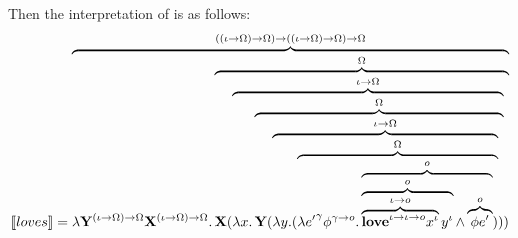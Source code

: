 Then the interpretation of  is as follows:
\begin{align}
\I{loves} = \overbrace{\lambda \Y2^{(\iota \rightarrow \Omega) \rightarrow \Omega} \X2^{(\iota \rightarrow \Omega) \rightarrow \Omega}.  \overbrace{\X2 ( \overbrace{\lambda \x1.  \overbrace{\Y2 ( \overbrace{\lambda \y1. (  \overbrace{\lambda {e'}^{\gamma} \phi^{\gamma \rightarrow o}. \overbrace{\overbrace{\overbrace{{\textbf{love}}^{\iota \rightarrow \iota \rightarrow o} {\x1}^{\iota}}^{\iota \rightarrow o} {\y1}^{\iota}}^{o} \land \overbrace{\phi e'}^{o}}^{o} )}^{\Omega}}^{\iota \rightarrow \Omega} )}^{\Omega}}^{\iota \rightarrow \Omega} )}^{\Omega} }^{((\iota \rightarrow \Omega) \rightarrow \Omega) \rightarrow ((\iota \rightarrow \Omega) \rightarrow \Omega) \rightarrow \Omega} \label{eq:dG:love}
\end{align}



